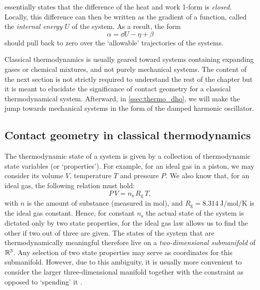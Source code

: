  essentially states that the difference of the heat and work 1-form is \emph{closed}. Locally, this difference can then be written as the gradient of a function, called the \emph{internal energy} $U$ of the system. As a result, the form 
$$ \alpha = \dd{U} - \eta + \beta $$
should pull back to zero over the `allowable' trajectories of the systems.

Classical thermodynamics is usually geared toward systems containing expanding gases or chemical mixtures, and not purely mechanical systems. The content of the next section is not strictly required to understand the rest of the chapter but it is meant to elucidate the significance of contact geometry for a classical thermodynamical system. Afterward, in \cref{ssec:thermo_dho}, we will make the jump towards mechanical systems in the form of the damped harmonic oscillator.

\subsection{Contact geometry in classical thermodynamics} 
The thermodynamic state of a system is given by a collection of thermodynamic state variables (or `properties'). For example, for an ideal gas in a piston, we may consider its volume $V$, temperature $T$ and pressure $P$. We also know that, for an ideal gas, the following relation must hold:
\begin{equation}
    P \, V = n_\text{s} \, R_\text{g} \, T,
    \label{eq:ideal_gas_pv}
\end{equation}
with $n$ is the amount of substance (measured in \si{\mole}), and $R_\text{g} = \SI{8.314}{\joule \per \mole \per \kelvin}$ is the ideal gas constant.  Hence, for constant $n_\text{s}$ the actual state of the system is dictated only by two state properties, for the ideal gas law allows us to find the other if two out of three are given. The states of the system that are thermodynamically meaningful therefore live on a \emph{two-dimensional submanifold} of $\mathbb{R}^3$. Any selection of two state properties may serve as coordinates for this submanifold. However, due to this ambiguity, it is usually more convenient to consider the larger three-dimensional manifold together with the constraint as opposed to `spending' it \cite{Balian2001, Giancoli2014}.

